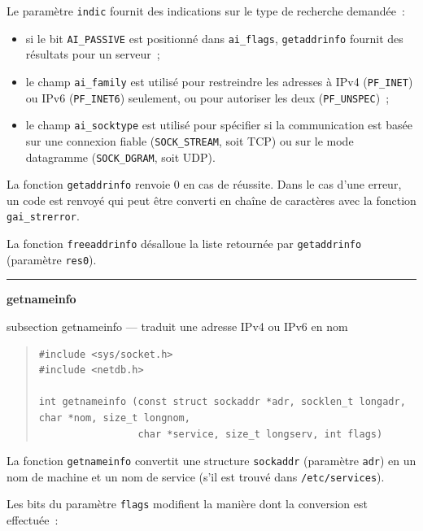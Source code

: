 \documentclass [twoside] {report}
\newcommand {\primitive} [1]
    {
	\phantomsection
	{\large \textbf {#1}}
	\addcontentsline {toc} {subsection} {#1}
    }
\newcommand {\separation}
    {
	\vspace {5mm}
	\nopagebreak
	\hrule
    }
\begin{document}
Le paramètre \texttt {indic} fournit des indications sur le type 
de recherche demandée~:

\begin {itemize}
    \item si le bit \texttt {AI\_PASSIVE} est positionné dans \texttt
	{ai\_flags}, \texttt {getaddrinfo} fournit des résultats pour
	un serveur~;

    \item le champ \texttt {ai\_family} est utilisé pour restreindre
	les adresses à IPv4 (\texttt {PF\_INET}) ou IPv6 (\texttt
	{PF\_INET6}) seulement, ou pour autoriser les deux (\texttt
	{PF\_UNSPEC})~;

    \item le champ \texttt {ai\_socktype} est utilisé pour spécifier
	si la communication est basée sur une connexion fiable
	(\texttt {SOCK\_STREAM}, soit TCP) ou sur le mode datagramme
	(\texttt {SOCK\_DGRAM}, soit UDP).

\end {itemize}

La fonction \texttt {getaddrinfo} renvoie 0 en cas de réussite.
Dans le cas d'une erreur, un code est renvoyé qui peut être converti
en chaîne de caractères avec la fonction \texttt {gai\_strerror}.

La fonction \texttt {freeaddrinfo} désalloue la liste retournée par
\texttt {getaddrinfo} (paramètre \texttt {res0}).


\separation
\primitive {getnameinfo} --- traduit une adresse IPv4 ou IPv6 en nom

\begin {quote}
\begin {verbatim}
#include <sys/socket.h>
#include <netdb.h>

int getnameinfo (const struct sockaddr *adr, socklen_t longadr, char *nom, size_t longnom,
                 char *service, size_t longserv, int flags)
\end{verbatim}
\end {quote}

La fonction \texttt {getnameinfo} convertit une structure \texttt
{sockaddr} (paramètre \texttt {adr}) en un nom de machine et un nom
de service (s'il est trouvé dans \texttt {/etc/services}).

Les bits du paramètre \texttt {flags} modifient la manière dont la
conversion est effectuée~:
\end{document}
